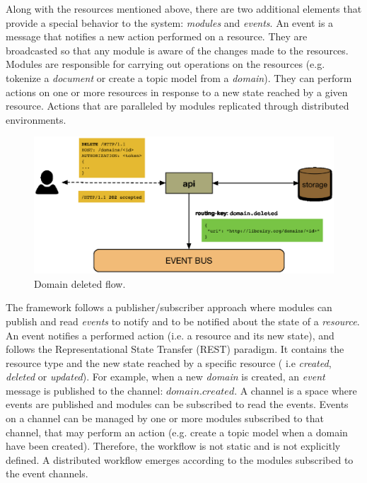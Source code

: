 Along with the resources mentioned above, there are two additional elements that provide a special behavior to the system: \textit{modules} and \textit{events}. An event is a message that notifies a new action performed on a resource. They are broadcasted so that any module is aware of the changes made to the resources. Modules are responsible for carrying out operations on the resources (e.g. tokenize a \textit{document} or create a topic model from a \textit{domain}). They can perform actions on one or more resources in response to a new state reached by a given resource. Actions that are paralleled by modules replicated through distributed environments.

\begin{figure}
  \center
  \includegraphics[scale=0.45]{api-domain-deleted}
  \caption{Domain deleted flow.}
  \label{fig:librairy-domain-deleted}
\end{figure}


The framework follows a publisher/subscriber approach where modules can publish and read \textit{events} to notify and to be notified about the state of a \textit{resource}. An event notifies a performed action (i.e. a resource and its new state), and follows the Representational State Transfer (REST)\cite{Fielding2002} paradigm. It contains the resource type and the new state reached by a specific resource ( i.e \textit{created}, \textit{deleted} or \textit{updated}). For example, when a new \textit{domain} is created, an \textit{event} message is published to the channel: $domain.created$. A channel is a space where events are published and modules can be subscribed to read the events. Events on a channel can be managed by one or more modules subscribed to that channel, that may perform an action (e.g. create a topic model when a domain have been created). Therefore, the workflow is not static and is not explicitly defined. A distributed workflow emerges according to the modules subscribed to the event channels.

